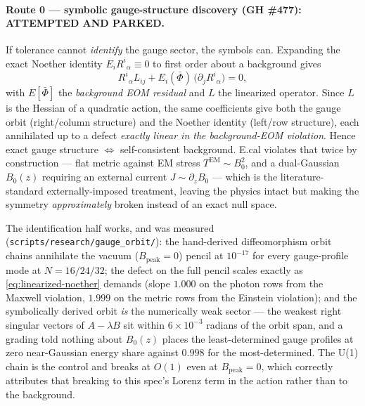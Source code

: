 \paragraph{Route 0 --- symbolic gauge-structure discovery (GH \#477):
ATTEMPTED AND PARKED.} If tolerance cannot \emph{identify} the gauge
sector, the symbols can. Expanding the exact Noether identity
$E_i R^i{}_\alpha \equiv 0$ to first order about a background gives
\begin{equation}
  R^i{}_\alpha L_{ij} + E_i(\bar\Phi)\,\bigl(\partial_j R^i{}_\alpha\bigr) = 0 ,
  \label{eq:linearized-noether}
\end{equation}
with $E[\bar\Phi]$ the \emph{background EOM residual} and $L$ the
linearized operator. Since $L$ is the Hessian of a quadratic action, the
same coefficients give both the gauge orbit (right/column structure) and
the Noether identity (left/row structure), each annihilated up to a defect
\emph{exactly linear in the background-EOM violation}. Hence exact gauge
structure $\iff$ self-consistent background. E.cal violates that twice by
construction --- flat metric against EM stress $T^{\mathrm{EM}} \sim
B_0^2$, and a dual-Gaussian $B_0(z)$ requiring an external current
$J \sim \partial_z B_0$ --- which is the literature-standard
externally-imposed treatment, leaving the physics intact but making the
symmetry \emph{approximately} broken instead of an exact null space.

The identification half works, and was measured
(\texttt{scripts/research/gauge\_orbit/}): the hand-derived
diffeomorphism orbit chains annihilate the vacuum ($B_{\mathrm{peak}}=0$)
pencil at $10^{-17}$ for every gauge-profile mode at $N=16/24/32$; the
defect on the full pencil scales exactly as
\cref{eq:linearized-noether} demands (slope $1.000$ on the photon rows
from the Maxwell violation, $1.999$ on the metric rows from the Einstein
violation); and the symbolically derived orbit \emph{is} the numerically
weak sector --- the weakest right singular vectors of $A - \lambda B$ sit
within $6\times10^{-3}$ radians of the orbit span, and a grading told
nothing about $B_0(z)$ places the least-determined gauge profiles at zero
near-Gaussian energy share against $0.998$ for the most-determined. The
U(1) chain is the control and breaks at $O(1)$ even at
$B_{\mathrm{peak}}=0$, which correctly attributes that breaking to this
spec's Lorenz term in the action rather than to the background.

